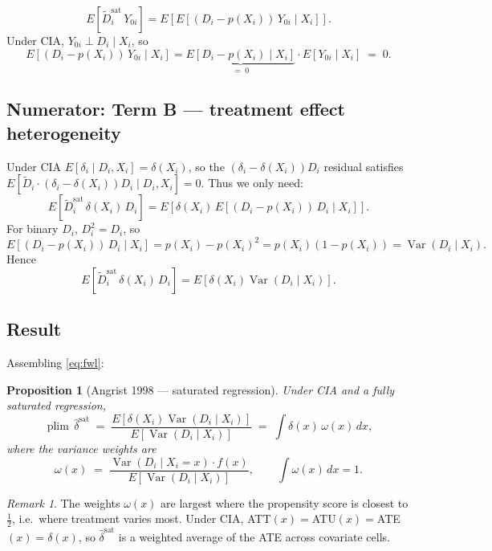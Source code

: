 \documentclass[11pt]{article}
\newtheorem{proposition}[theorem]{Proposition}
\theoremstyle{remark}
\newtheorem{remark}{Remark}
\begin{document}
\[
  E[\tilde D_i^{\mathrm{sat}}\, Y_{0i}]
  = E\!\left[E\!\left[(D_i - p(X_i))\,Y_{0i} \mid X_i\right]\right].
\]
Under CIA, $Y_{0i} \perp D_i \mid X_i$, so
\[
  E[(D_i - p(X_i))\,Y_{0i} \mid X_i]
  = \underbrace{E[D_i - p(X_i)\mid X_i]}_{=\;0} \cdot E[Y_{0i}\mid X_i] \;=\; 0.
\]

\subsection*{Numerator: Term B --- treatment effect heterogeneity}

Under CIA $E[\delta_i \mid D_i, X_i] = \delta(X_i)$, so the $(\delta_i-\delta(X_i))D_i$
residual satisfies $E[\tilde D_i \cdot (\delta_i - \delta(X_i))D_i \mid D_i,X_i] = 0$.
Thus we only need:
\[
  E[\tilde D_i^{\mathrm{sat}}\,\delta(X_i)\,D_i]
  = E\!\left[\delta(X_i)\,E[(D_i - p(X_i))\,D_i \mid X_i]\right].
\]
For binary $D_i$, $D_i^2 = D_i$, so
\[
  E[(D_i - p(X_i))\,D_i \mid X_i] = p(X_i) - p(X_i)^2
  = p(X_i)(1-p(X_i)) = \operatorname{Var}(D_i\mid X_i).
\]
Hence
\[
  E[\tilde D_i^{\mathrm{sat}}\,\delta(X_i)\,D_i]
  = E\!\left[\delta(X_i)\operatorname{Var}(D_i\mid X_i)\right].
\]

\subsection*{Result}

Assembling \eqref{eq:fwl}:

\begin{proposition}[Angrist 1998 --- saturated regression]\label{prop:sat}
Under CIA and a fully saturated regression,
\[
  \operatorname{plim}\,\hat\delta^{\mathrm{sat}}
  \;=\;
  \frac{E\!\left[\delta(X_i)\operatorname{Var}(D_i\mid X_i)\right]}
       {E\!\left[\operatorname{Var}(D_i\mid X_i)\right]}
  \;=\;
  \int \delta(x)\,\omega(x)\,dx,
\]
where the variance weights are
\[
  \omega(x) \;=\;
  \frac{\operatorname{Var}(D_i\mid X_i=x)\cdot f(x)}
       {E[\operatorname{Var}(D_i\mid X_i)]}, \qquad \int\omega(x)\,dx = 1.
\]
\end{proposition}

\begin{remark}
The weights $\omega(x)$ are largest where the propensity score is closest to $\tfrac12$,
i.e.\ where treatment varies most.  Under CIA, ATT$(x)=$ATU$(x)=$ATE$(x)=\delta(x)$,
so $\hat\delta^{\mathrm{sat}}$ is a weighted average of the ATE across covariate cells.
\end{remark}

\end{document}
